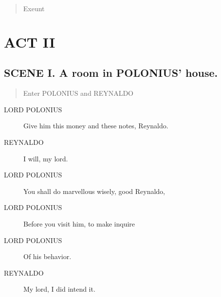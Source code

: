 \documentclass{article}
\begin{document}
\begin{quote}
Exeunt
\end{quote}
          
\section{ACT II}
    
\subsection{SCENE I.  A room in POLONIUS' house.}
          
\begin{quote}
Enter POLONIUS and REYNALDO
\end{quote}
          
\begin{description}
            
\item[LORD POLONIUS] Give him this money and these notes, Reynaldo.
\end{description}
          
\begin{description}
            
\item[REYNALDO] I will, my lord.
\end{description}
          
\begin{description}
            
\item[LORD POLONIUS] You shall do marvellous wisely, good Reynaldo,
\item[LORD POLONIUS] Before you visit him, to make inquire
\item[LORD POLONIUS] Of his behavior.
\end{description}
          
\begin{description}
            
\item[REYNALDO] My lord, I did intend it.
\end{description}
          
\end{document}

